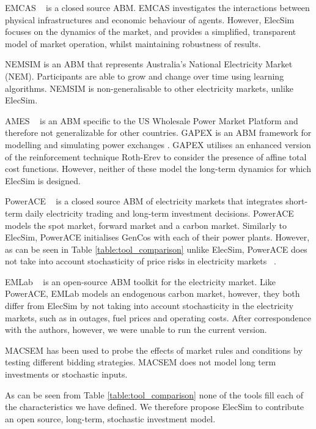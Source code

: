 EMCAS ~\cite{Conzelmann} is a closed source ABM. EMCAS investigates the interactions between physical infrastructures and economic behaviour of agents. However, ElecSim focuses on the dynamics of the market, and provides a simplified, transparent model of market operation, whilst maintaining robustness of results.

NEMSIM \cite{Grozev2005} is an ABM that represents Australia's National Electricity Market (NEM). Participants are able to grow and change over time using learning algorithms. NEMSIM is non-generalisable to other electricity markets, unlike ElecSim.

AMES ~\cite{Sun2007} is an ABM specific to the US Wholesale Power Market Platform and therefore not generalizable for other countries. GAPEX \cite{Cincotti2013} is an ABM framework for modelling and simulating power exchanges . GAPEX utilises an enhanced version of the reinforcement technique Roth-Erev \cite{RothAE1995} to consider the presence of affine total cost functions. However, neither of these model the long-term dynamics for which ElecSim is designed.



PowerACE ~\cite{Rothengatter2007} is a closed source ABM of electricity markets that integrates short-term daily electricity trading and long-term investment decisions. PowerACE models the spot market, forward market and a carbon market. Similarly to ElecSim, PowerACE initialises GenCos with each of their power plants. However, as can be seen in Table \ref{table:tool_comparison} unlike ElecSim, PowerACE does not take into account stochasticity of price risks in electricity markets ~\cite{Most2010}.

EMLab ~\cite{Chappin2017} is an open-source ABM toolkit for the electricity market. Like PowerACE, EMLab models an endogenous carbon market, however, they both differ from ElecSim by not taking into account stochasticity in the electricity markets, such as in outages, fuel prices and operating costs. After correspondence with the authors, however, we were unable to run the current version.

MACSEM \cite{Praca2003} has been used to probe the effects of market rules and conditions by testing different bidding strategies. MACSEM does not model long term investments or stochastic inputs.


As can be seen from Table \ref{table:tool_comparison} none of the tools fill each of the characteristics we have defined. We therefore propose ElecSim to contribute an open source, long-term, stochastic investment model. 


